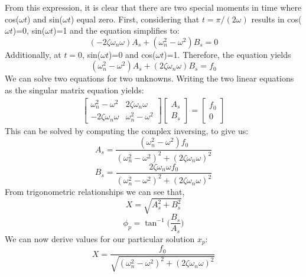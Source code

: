 \documentclass[12pt,letter]{article}
\begin{document}
	From this expression, it is clear that there are two special moments in time where cos($\omega t$) and sin($\omega t$) equal zero. First, considering that $t=\pi/(2\omega)$ results in cos($\omega t$)=0, sin($\omega t$)=1 and the equation simplifies to:
	\begin{equation}
		(-2\zeta \omega_n \omega)A_s + (\omega_n^2 - \omega^2)B_s = 0
	\end{equation}	
	Additionally, at $t=0$, sin($\omega t$)=0 and cos($\omega t$)=1. Therefore, the equation yields		
	\begin{equation}
		(\omega_n^2 - \omega^2)A_s + (2\zeta \omega_n \omega)B_s = f_0
	\end{equation}				
	We can solve two equations for two unknowns. Writing the two linear equations as the singular matrix equation yields:
	\begin{gather}
\begin{bmatrix}
\omega_n^2 - \omega^2 & 2\zeta \omega_n \omega \\
- 2\zeta \omega_n \omega &  \omega_n^2 - \omega^2
\end{bmatrix}
\begin{bmatrix}
A_s \\
B_s
\end{bmatrix}
= \begin{bmatrix} f_0 \\ 0
\end{bmatrix}
	\end{gather}
	This can be solved by computing the complex inversing, to give us:
	\begin{equation}
		A_s = \frac{(\omega_n^2 - \omega^2)f_0}{(\omega_n^2 - \omega^2)^2 +  (2\zeta \omega_n \omega)^2}
	\end{equation}	
	\begin{equation}
		B_s = \frac{2\zeta \omega_n \omega f_0}{(\omega_n^2 - \omega^2)^2 +  (2\zeta \omega_n \omega)^2}
	\end{equation}	
	From trigonometric relationships we can see that, 
	\begin{equation}
		X = \sqrt{A_s^2 + B_s^2}
	\end{equation}	
	\begin{equation}
		\phi_p = \tan^{-1}\bigg(\frac{B_s}{A_s}\bigg)
	\end{equation}	
	We can now derive values for our particular solution $x_p$:
	\begin{equation}
		X = \frac{f_0}{\sqrt{(\omega_n^2 - \omega^2)^2 +  (2\zeta \omega_n \omega)^2}} 
		\label{eq:X_damped}
	\end{equation}	
\end{document}
